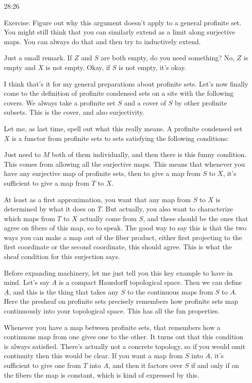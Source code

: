 \begin{example}
\begin{unfinished}{28:26}
\begin{remark}
Exercise: Figure out why this argument doesn't apply to a general profinite set. You might still think that you can similarly extend as a limit along surjective maps. You can always do that and then try to inductively extend.

\begin{remark}

Just a small remark. If $Z$ and $S$ are both empty, do you need something? No, $Z$ is empty and $X$ is not empty. Okay, if $S$ is not empty, it's okay.

\end{remark}

I think that's it for my general preparations about profinite sets. Let's now finally come to the definition of profinite condensed sets on a site with the following covers. We always take a profinite set $S$ and a cover of $S$ by other profinite subsets. This is the cover, and also surjectivity.

Let me, as last time, spell out what this really means. A profinite condensed set $X$ is a functor from profinite sets to sets satisfying the following conditions:

Just need to $M$ both of them individually, and then there is this funny condition. This comes from allowing all the surjective maps. This means that whenever you have any surjective map of profinite sets, then to give a map from $S$ to $X$, it's sufficient to give a map from $T$ to $X$. 

At least as a first approximation, you want that any map from $S$ to $X$ is determined by what it does on $T$. But actually, you also want to characterize which maps from $T$ to $X$ actually come from $S$, and these should be the ones that agree on fibers of this map, so to speak. The good way to say this is that the two ways you can make a map out of the fiber product, either first projecting to the first coordinate or the second coordinate, this should agree. This is what the sheaf condition for this surjection says.

Before expanding machinery, let me just tell you this key example to have in mind. Let's say $A$ is a compact Hausdorff topological space. Then we can define $\underline{A}$, and this is the thing that takes any $S$ to the continuous maps from $S$ to $A$. Here the presheaf on profinite sets precisely remembers how profinite sets map continuously into your topological space. This has all the fun properties.

Whenever you have a map between profinite sets, that remembers how a continuous map from one gives one to the other. It turns out that this condition is always satisfied. There's actually not a concrete topology, so if you would omit continuity then this would be clear. If you want a map from $S$ into $A$, it's sufficient to give one from $T$ into $A$, and then it factors over $S$ if and only if on the fibers the map is constant, which is kind of expressed by this.


\end{remark}
\end{unfinished}
\end{example}
